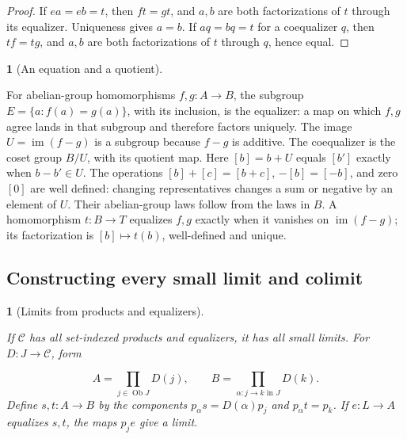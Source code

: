 \documentclass[11pt,a4paper]{article}
\newcommand{\mathheading}{}
\theoremstyle{plain}
\newtheorem*{plainstatement}{\mathheading}
\theoremstyle{definition}
\newtheorem*{definitionstatement}{\mathheading}
\newenvironment{mathstatement}[3]{\renewcommand{\mathheading}{#1 #2}\begin{plainstatement}[#3]}{\end{plainstatement}}
\newenvironment{mathdefinition}[3]{\renewcommand{\mathheading}{#1 #2}\begin{definitionstatement}[#3]}{\end{definitionstatement}}
\begin{document}
\begin{proof}

If \(ea=eb=t\), then \(ft=gt\), and \(a,b\) are both factorizations of \(t\) through its equalizer. Uniqueness gives \(a=b\). If \(aq=bq=t\) for a coequalizer \(q\), then \(tf=tg\), and \(a,b\) are both factorizations of \(t\) through \(q\), hence equal.


\end{proof}
 
\begin{mathdefinition}{Example}{2.8}{An equation and a quotient}
\label{env-2-8}

For abelian-group homomorphisms \(f,g:A\to B\), the subgroup \(E=\{a:f(a)=g(a)\}\), with its inclusion, is the equalizer: a map on which \(f,g\) agree lands in that subgroup and therefore factors uniquely. The image \(U=\operatorname{im}(f-g)\) is a subgroup because \(f-g\) is additive. The coequalizer is the coset group \(B/U\), with its quotient map. Here \([b]=b+U\) equals \([b']\) exactly when \(b-b'\in U\). The operations \([b]+[c]=[b+c]\), \(-[b]=[-b]\), and zero \([0]\) are well defined: changing representatives changes a sum or negative by an element of \(U\). Their abelian-group laws follow from the laws in \(B\). A homomorphism \(t:B\to T\) equalizes \(f,g\) exactly when it vanishes on \(\operatorname{im}(f-g)\); its factorization is \([b]\mapsto t(b)\), well-defined and unique.


\par{}\par

\end{mathdefinition}
 
\subsection{Constructing every small limit and colimit}

\begin{mathstatement}{Theorem}{2.9}{Limits from products and equalizers}
\label{env-2-9}

If \(\mathcal C\) has all set-indexed products and equalizers, it has all small limits. For \(D:J\to\mathcal C\), form

\[A=\prod_{j\in\operatorname{Ob}J}D(j),\qquad B=\prod_{\alpha:j\to k\text{ in }J}D(k).\] 
Define \(s,t:A\to B\) by the components \(p_\alpha s=D(\alpha)p_j\) and \(p_\alpha t=p_k\). If \(e:L\to A\) equalizes \(s,t\), the maps \(p_je\) give a limit.


\par{}\par

\end{mathstatement}
 
\end{document}

